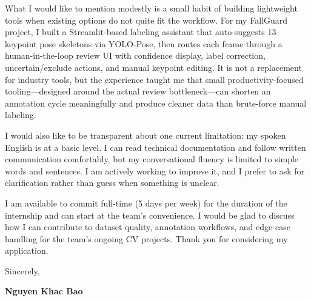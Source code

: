 \documentclass[11pt, a4paper]{article}
\begin{document}
What I would like to mention modestly is a small habit of building lightweight tools when existing options do not quite fit the workflow. For my FallGuard project, I built a Streamlit-based labeling assistant that auto-suggests 13-keypoint pose skeletons via YOLO-Pose, then routes each frame through a human-in-the-loop review UI with confidence display, label correction, uncertain/exclude actions, and manual keypoint editing. It is not a replacement for industry tools, but the experience taught me that small productivity-focused tooling---designed around the actual review bottleneck---can shorten an annotation cycle meaningfully and produce cleaner data than brute-force manual labeling.

I would also like to be transparent about one current limitation: my spoken English is at a basic level. I can read technical documentation and follow written communication comfortably, but my conversational fluency is limited to simple words and sentences. I am actively working to improve it, and I prefer to ask for clarification rather than guess when something is unclear.

I am available to commit full-time (5 days per week) for the duration of the internship and can start at the team's convenience. I would be glad to discuss how I can contribute to dataset quality, annotation workflows, and edge-case handling for the team's ongoing CV projects. Thank you for considering my application.

\vspace{12pt}

Sincerely,

\vspace{18pt}

\textbf{Nguyen Khac Bao}
\end{document}
